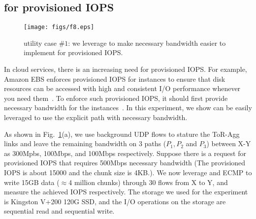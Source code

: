 \subsection{\sys for provisioned IOPS}\label{subsec:iops}

\begin{figure}[t]
\centering
\texttt{[image: figs/f8.eps]}\hspace{-0.2in}
\caption[Optional caption for list of figures]{\sys utility case $\#1$: we leverage \sys to make necessary bandwidth easier to implement for provisioned IOPS.}
\label{fig:iops}
\vspace{-0.2in}
\end{figure}

In cloud services, there is an increasing need for provisioned IOPS. For example, Amazon EBS enforces provisioned IOPS for instances to ensure that disk resources can be accessed with high and consistent I/O performance whenever you need them~\cite{privisionIO-EBS}. To enforce such provisioned IOPS, it should first provide necessary bandwidth for the instances~\cite{io-characteristics}. In this experiment, we show \sys can be easily leveraged to use the explicit path with necessary bandwidth.

As shown in Fig.~\ref{fig:iops}(a), we use background UDP flows to stature the ToR-Agg links and leave the remaining bandwidth on 3 paths ($P_1, P_2$ and $P_3$) between X-Y as 300Mpbs, 100Mbps, and 100Mbps respectively. Suppose there is a request for provisioned IOPS that requires 500Mbps necessary bandwidth (The provisioned IOPS is about 15000 and the chunk size is 4KB.). We now leverage \sys and ECMP to write 15GB data ($\approx$4 million chunks) through 30 flows from X to Y, and measure the achieved IOPS respectively. The storage we used for the experiment is Kingston V+200 120G SSD, and the I/O operations on the storage are sequential read and sequential write.

